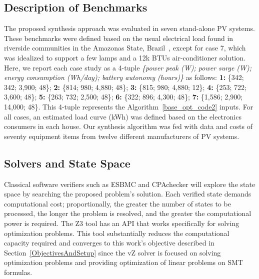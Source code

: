 \documentclass[10pt,journal,compsoc]{IEEEtran}
\begin{document}
\subsection{Description of Benchmarks}

The proposed synthesis approach was evaluated in seven stand-alone PV systems. These benchmarks were defined based on the usual electrical load found in riverside communities in the Amazonas State, Brazil~\cite{TrindadeCordeiro19,Agrener2013}, except for case 7, which was idealized to support a few lamps and a 12k BTUs air-conditioner solution. 
Here, we report each case study as a 4-tuple \textit{\{power peak (W); power surge (W); energy consumption (Wh/day); battery autonomy (hours)\}} as follows:
  \textbf{1:} \{342; 342; 3,900; 48\}; \textbf{2:} \{814; 980; 4,880; 48\}; \textbf{3:} \{815; 980; 4,880; 12\}; \textbf{4:} \{253; 722; 3,600; 48\}; \textbf{5:} \{263; 732; 2,500; 48\}; \textbf{6:} \{322; 896; 4,300; 48\}; \textbf{7:} \{1,586; 2,900; 14,000; 48\}. This 4-tuple represents the Algorithm~\ref{base_opt_code2} inputs. For all cases, an estimated load curve (kWh) was defined based on the electronics consumers in each house. Our synthesis algorithm was fed with data and costs of seventy equipment items from twelve different manufacturers of PV systems. 
%

\subsection{Solvers and State Space}
\label{sec:SolversandStateSpace}
  Classical software verifiers such as ESBMC and CPAchecker will explore the state space by searching the proposed problem's solution. Each verified state demands computational cost; proportionally, the greater the number of states to be processed, the longer the problem is resolved, and the greater the computational power is required. The Z3 tool has an API that works specifically for solving optimization problems. This tool substantially reduces the computational capacity required and converges to this work's objective described in Section~\ref{ObjectivesAndSetup} since the vZ solver is focused on solving optimization problems and providing optimization of linear problems on SMT formulas.
\end{document}
